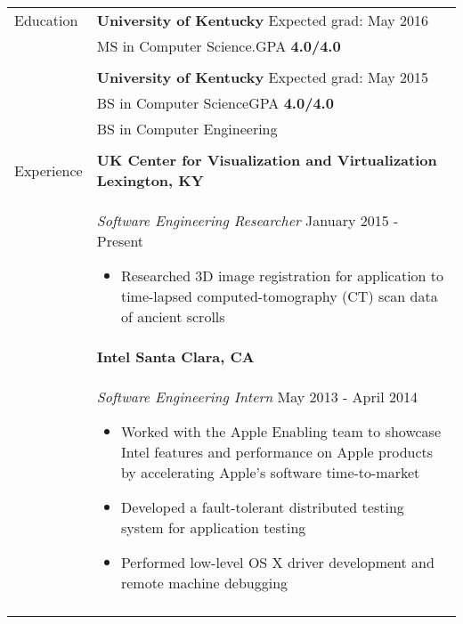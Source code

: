 \documentclass[11pt]{article}
\begin{document}
\begin{tabular}{p{1.0in} p{5.16in}}

    {Education} &

        \textbf{University of Kentucky} \hfill Expected grad: May 2016\vspace{0.015in} \\ &
        MS in Computer Science.\hfill GPA \textbf{4.0/4.0} \vspace{0.015in} \\ & \\ &

        \textbf{University of Kentucky} \hfill Expected grad: May 2015\vspace{0.015in} \\ &
        BS in Computer Science\hfill GPA \textbf{4.0/4.0} \vspace{0.015in} \\ &
        BS in Computer Engineering \\ \\

    {Experience} &
        \textbf{UK Center for Visualization and Virtualization \hfill Lexington, KY}\vspace{0.015in} \\ &
        {\textit{Software Engineering Researcher} \hfill January 2015 - Present}\vspace{0.015in}
        \begin{itemize}
            \renewcommand{\labelitemi}{$\diamond$}
            \item Researched 3D image registration for application to time-lapsed computed-tomography (CT) scan data of ancient scrolls
        \end{itemize} \\ &


        \textbf{Intel \hfill Santa Clara, CA}\vspace{0.015in} \\ &
        {\textit{Software Engineering Intern} \hfill May 2013 - April 2014}\vspace{0.015in}
        \begin{itemize}
            \renewcommand{\labelitemi}{$\diamond$}
            \item Worked with the Apple Enabling team to showcase Intel features and performance on Apple products by accelerating Apple’s software time-to-market
            \item Developed a fault-tolerant distributed testing system for application testing
            \item Performed low-level OS X driver development and remote machine debugging
        \end{itemize} \\ &


\end{tabular}
\end{document}
